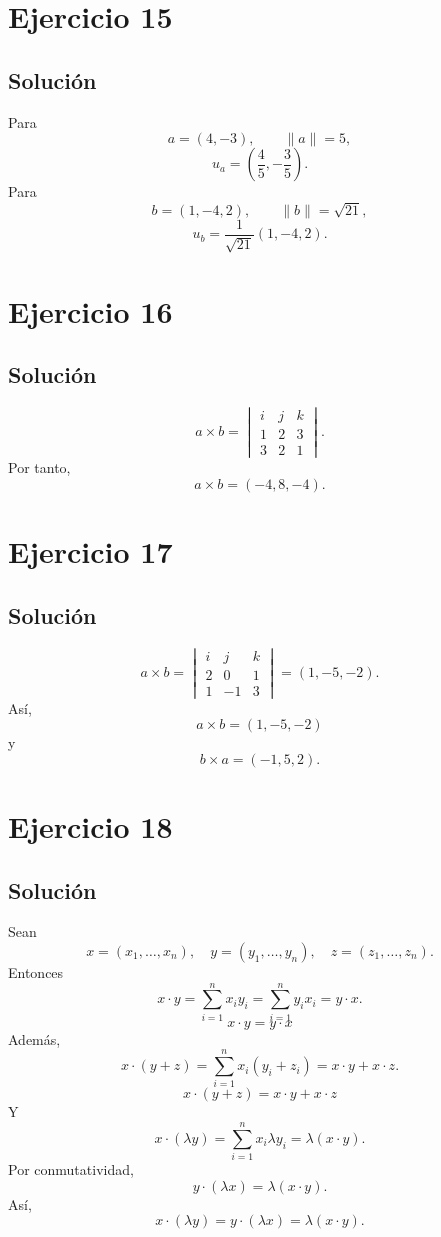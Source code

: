 \documentclass[11pt,a4paper]{article}
\begin{document}
\section{Ejercicio 15}
\subsection{Solución}
Para
\[
a=(4,-3),
\qquad
\|a\|=5,
\]
\[
\boxed{
u_a=
\left(\frac45,-\frac35\right).
}
\]
Para
\[
b=(1,-4,2),
\qquad
\|b\|=\sqrt{21},
\]
\[
\boxed{
u_b=
\frac1{\sqrt{21}}(1,-4,2).
}
\]

\section{Ejercicio 16}
\subsection{Solución}
\[
a\times b
=
\begin{vmatrix}
i&j&k\\
1&2&3\\
3&2&1
\end{vmatrix}.
\]
Por tanto,
\[
\boxed{
a\times b=(-4,8,-4).
}
\]

\section{Ejercicio 17}
\subsection{Solución}
\[
a\times b
=
\begin{vmatrix}
i&j&k\\
2&0&1\\
1&-1&3
\end{vmatrix}
=
(1,-5,-2).
\]
Así,
\[
\boxed{a\times b=(1,-5,-2)}
\]
y
\[
\boxed{b\times a=(-1,5,2)}.
\]

\section{Ejercicio 18}
\subsection{Solución}
Sean
\[
x=(x_1,\ldots,x_n),
\quad
y=(y_1,\ldots,y_n),
\quad
z=(z_1,\ldots,z_n).
\]
Entonces
\[
x\cdot y
=
\sum_{i=1}^nx_iy_i
=
\sum_{i=1}^ny_ix_i
=
y\cdot x.
\]
\[
\boxed{x\cdot y=y\cdot x}
\]
Además,
\[
x\cdot(y+z)
=
\sum_{i=1}^nx_i(y_i+z_i)
=
x\cdot y+x\cdot z.
\]
\[
\boxed{x\cdot(y+z)=x\cdot y+x\cdot z}
\]
Y
\[
x\cdot(\lambda y)
=
\sum_{i=1}^nx_i\lambda y_i
=
\lambda(x\cdot y).
\]
Por conmutatividad,
\[
y\cdot(\lambda x)=\lambda(x\cdot y).
\]
Así,
\[
\boxed{
x\cdot(\lambda y)
=
y\cdot(\lambda x)
=
\lambda(x\cdot y).
}
\]
\end{document}
